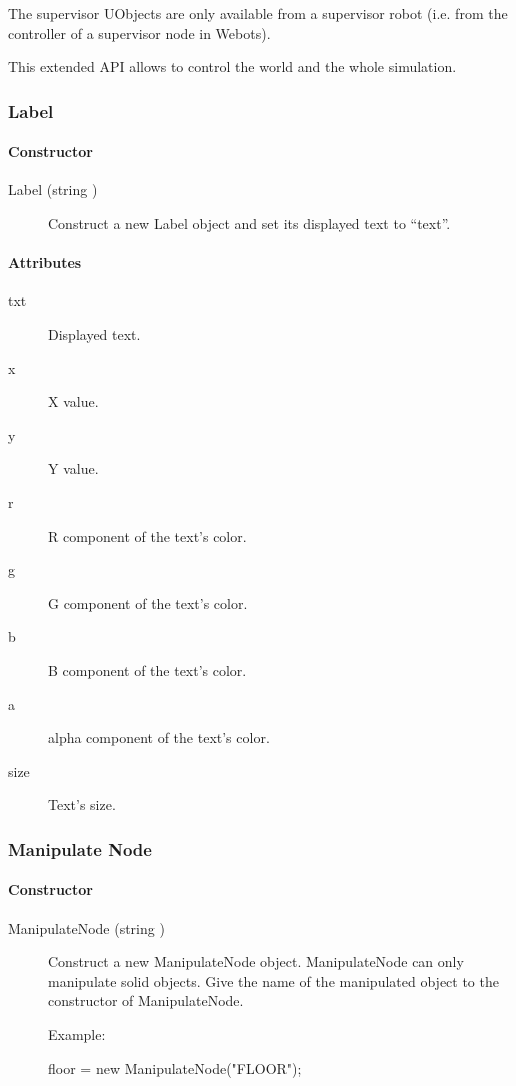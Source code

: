 The supervisor UObjects are only available from a supervisor robot
(i.e. from the controller of a supervisor node in Webots).

This extended API allows \urbi to control the world and the whole
simulation.


\subsubsection{Label}
\paragraph{Constructor}
\noindent
\begin{description}
\item[{Label (string )}] Construct a new Label object and
  set its displayed text to ``text''.
\end{description}

\paragraph{Attributes}

\noindent
\begin{description}
\item[txt] Displayed text.
\item[x] X value.
\item[y] Y value.
\item[r] R component of the text's color.
\item[g] G component of the text's color.
\item[b] B component of the text's color.
\item[a] alpha component of the text's color.
\item[size] Text's size.
\end{description}

\subsubsection{Manipulate Node}

\paragraph{Constructor}

\noindent
\begin{description}
\item[{ManipulateNode (string )}]
  Construct a new ManipulateNode object. ManipulateNode can only
  manipulate solid objects. Give the name of the manipulated object to
  the constructor of ManipulateNode.

Example:

\begin{urbifixme}
floor = new ManipulateNode("FLOOR");
\end{urbifixme}
\end{description}

